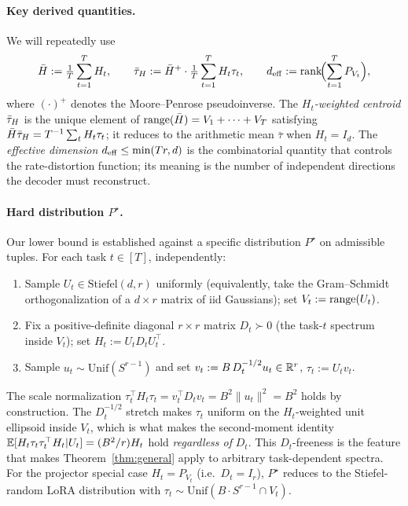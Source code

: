 \paragraph{Key derived quantities.} We will repeatedly use
\begin{equation}\label{eq:derived}
  \bar H := \tfrac1T\sum_{t=1}^T H_t,\qquad
  \bar{\tau}_H := \bar H^+\cdot \tfrac1T\sum_{t=1}^T H_t\tau_t,\qquad
  d_{\mathrm{eff}} := \operatorname{rank}\!\Bigl(\sum_{t=1}^T P_{V_t}\Bigr),
\end{equation}
where $(\cdot)^+$ denotes the Moore--Penrose pseudoinverse. The
\emph{$H_t$-weighted centroid} $\bar{\tau}_H$ is the unique element of
$\operatorname{range}(\bar H) = V_1 + \cdots + V_T$ satisfying $\bar H\bar{\tau}_H =
T^{-1}\sum_t H_t\tau_t$; it reduces to the arithmetic mean
$\bar\tau$ when $H_t = I_d$. The \emph{effective dimension}
$d_{\mathrm{eff}} \leq \min(Tr, d)$ is the combinatorial quantity that
controls the rate-distortion function; its meaning is the number
of independent directions the decoder must reconstruct.

\paragraph{Hard distribution $P^\star$.} Our lower bound is
established against a specific distribution $P^\star$ on
admissible tuples. For each task $t\in[T]$, independently:
\begin{enumerate}[leftmargin=*,topsep=2pt,itemsep=2pt]
  \item Sample $U_t\in\mathrm{Stiefel}(d, r)$ uniformly
  (equivalently, take the Gram--Schmidt orthogonalization of a
  $d\times r$ matrix of iid Gaussians); set $V_t := \operatorname{range}(U_t)$.
  \item Fix a positive-definite diagonal $r\times r$ matrix
  $D_t\succ 0$ (the task-$t$ spectrum inside $V_t$); set $H_t :=
  U_t D_t U_t^\top$.
  \item Sample $u_t\sim\mathrm{Unif}(S^{r-1})$ and set
  $v_t := B\, D_t^{-1/2} u_t \in\mathbb{R}^r$, $\tau_t := U_t v_t$.
\end{enumerate}
The scale normalization $\tau_t^\top H_t\tau_t = v_t^\top D_t
v_t = B^2\|u_t\|^2 = B^2$ holds by construction. The $D_t^{-1/2}$
stretch makes $\tau_t$ uniform on the $H_t$-weighted unit
ellipsoid inside $V_t$, which is what makes the second-moment
identity $\mathbb{E}[H_t\tau_t\tau_t^\top H_t | U_t] = (B^2/r) H_t$ hold
\emph{regardless of} $D_t$. This $D_t$-freeness is the feature
that makes Theorem~\ref{thm:general} apply to arbitrary
task-dependent spectra. For the projector special case $H_t =
P_{V_t}$ (i.e.\ $D_t = I_r$), $P^\star$ reduces to the
Stiefel-random LoRA distribution with $\tau_t\sim\mathrm{Unif}
(B\cdot S^{r-1}\cap V_t)$.

